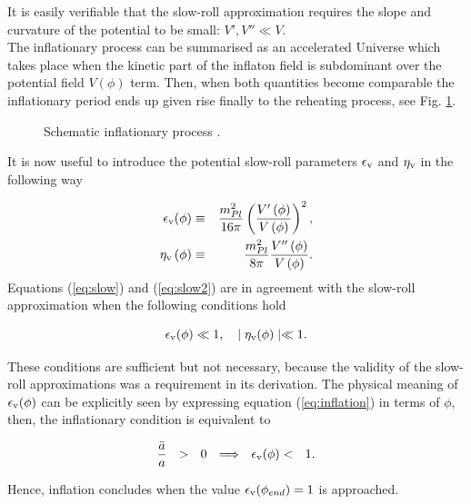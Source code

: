 \documentclass{rmaa}
\def\bea{\begin{eqnarray}}
\def\eea{\end{eqnarray}}
\begin{document}
\noindent
It is easily verifiable that the slow-roll approximation requires the slope 
and curvature of the potential to be small: $V', V'' \ll V$.
\\

The inflationary process can be summarised as an accelerated Universe which takes place when 
the kinetic part of the inflaton field is subdominant over the potential field $V(\phi)$ term. 
Then, when both quantities become comparable the inflationary period ends up given 
rise finally to the reheating process, see Fig. \ref{fig:Field}. 


\begin{figure}[ht] 
\centerline{ \epsfxsize=180pt  }
\caption{Schematic inflationary process \citep{Baumann}.}
\label{fig:Field}
\end{figure}

\vspace{0.5cm}
It is now useful to introduce the potential slow-roll parameters 
$\epsilon_{\rm v}$ and $\eta_{\rm v}$ in the following way \citep{Liddle92}


\bea
\epsilon_{\rm v}(\phi) &\equiv&{m^2_{Pl} \over 16 \pi } \left({V'\left(\phi\right) \over V\left(\phi\right)}\right)^2, 
\label{eq:epsi} \\
\eta_{\rm v}\left(\phi\right) &\equiv& \frac{m^2_{Pl}}{8\pi} {V''\left(\phi\right) \over V\left(\phi\right)} \label{eq:eta}.
\eea
%
Equations (\ref{eq:slow}) and (\ref{eq:slow2}) are in agreement with the slow-roll approximation
when the following conditions hold

\begin{equation*}
\epsilon_{\rm v}(\phi) \ll 1,  \,\,\,\,\,\,  \mid \eta_{\rm v}(\phi)\mid \ll 1.
\end{equation*}

\noindent
These conditions are sufficient but not necessary, because the validity of the slow-roll
approximations was a requirement in its derivation.
%
The physical meaning of $\epsilon_{\rm v}(\phi)$ can be explicitly seen by expressing equation (\ref{eq:inflation})
 in terms of $\phi$, then, the inflationary condition is equivalent to
 
 \begin{equation}
 {\ddot a \over a} ~~ > ~~ 0 ~~ \Longrightarrow ~~ \epsilon_{\rm v}(\phi) < ~~  1.
\end{equation}

\noindent
Hence, inflation concludes when the value $\epsilon_{\rm v} (\phi_{end})= 1$ is approached.
\\
\end{document}
